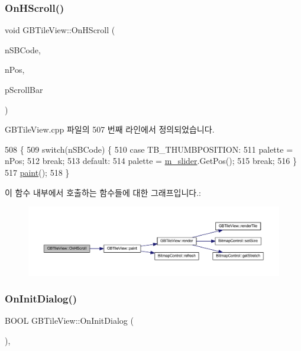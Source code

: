 \subsubsection{\texorpdfstring{On\+H\+Scroll()}{OnHScroll()}}
{\footnotesize\ttfamily void G\+B\+Tile\+View\+::\+On\+H\+Scroll (\begin{DoxyParamCaption}\item[{U\+I\+NT}]{n\+S\+B\+Code,  }\item[{U\+I\+NT}]{n\+Pos,  }\item[{C\+Scroll\+Bar $\ast$}]{p\+Scroll\+Bar }\end{DoxyParamCaption})\hspace{0.3cm}{\ttfamily [protected]}}



G\+B\+Tile\+View.\+cpp 파일의 507 번째 라인에서 정의되었습니다.


\begin{DoxyCode}
508 \{
509   \textcolor{keywordflow}{switch}(nSBCode) \{
510   \textcolor{keywordflow}{case} TB\_THUMBPOSITION:
511     palette = nPos;
512     \textcolor{keywordflow}{break};
513   \textcolor{keywordflow}{default}:
514     palette = \mbox{\hyperlink{class_g_b_tile_view_ace72ce81e68876fe62cb85b09405e296}{m\_slider}}.GetPos();
515     \textcolor{keywordflow}{break};
516   \}
517   \mbox{\hyperlink{class_g_b_tile_view_aa78a471956e777509644a0a04bab2c4d}{paint}}();
518 \}
\end{DoxyCode}
이 함수 내부에서 호출하는 함수들에 대한 그래프입니다.\+:
\nopagebreak
\begin{figure}[H]
\begin{center}
\leavevmode
\includegraphics[width=350pt]{class_g_b_tile_view_a0b2b262f47b7d6c3f53270eaf80a24a1_cgraph}
\end{center}
\end{figure}
\mbox{\label{class_g_b_tile_view_a4d97fe7dcfd863756d993834548d2ca6}} 
\subsubsection{\texorpdfstring{On\+Init\+Dialog()}{OnInitDialog()}}
{\footnotesize\ttfamily B\+O\+OL G\+B\+Tile\+View\+::\+On\+Init\+Dialog (\begin{DoxyParamCaption}{ }\end{DoxyParamCaption})\hspace{0.3cm}{\ttfamily [protected]}, {\ttfamily [virtual]}}



